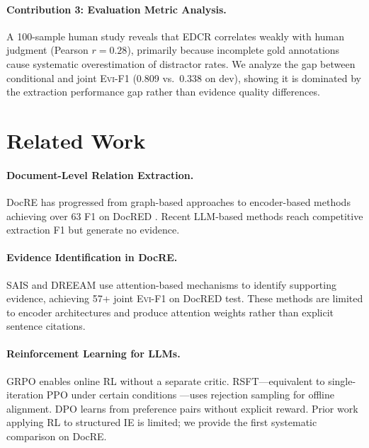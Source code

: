\documentclass[11pt,a4paper]{article}
\newcommand{\evi}{\textsc{Evi-F1}}
\newcommand{\edcr}{\textsc{EDCR}}
\begin{document}
\paragraph{Contribution 3: Evaluation Metric Analysis.}
A 100-sample human study reveals that \edcr{} correlates weakly with human judgment (Pearson $r{=}0.28$), primarily because incomplete gold annotations cause systematic overestimation of distractor rates. We analyze the gap between conditional and joint \evi{} (0.809 vs.\ 0.338 on dev), showing it is dominated by the extraction performance gap rather than evidence quality differences.

\section{Related Work}

\paragraph{Document-Level Relation Extraction.}
DocRE has progressed from graph-based approaches \cite{nan2020reasoning,zeng2020double} to encoder-based methods achieving over 63 F1 on DocRED \cite{yao2019docred}. Recent LLM-based methods \cite{xu2024lmrc,wadhwa2023revisiting} reach competitive extraction F1 but generate no evidence.

\paragraph{Evidence Identification in DocRE.}
SAIS \cite{xie2022eider} and DREEAM \cite{ma2023dreeam} use attention-based mechanisms to identify supporting evidence, achieving 57+ joint \evi{} on DocRED test. These methods are limited to encoder architectures and produce attention weights rather than explicit sentence citations.

\paragraph{Reinforcement Learning for LLMs.}
GRPO \cite{shao2024deepseekmath} enables online RL without a separate critic. RSFT---equivalent to single-iteration PPO under certain conditions \cite{tajwar2024preference}---uses rejection sampling for offline alignment. DPO \cite{rafailov2024direct} learns from preference pairs without explicit reward. Prior work applying RL to structured IE is limited; we provide the first systematic comparison on DocRE.
\end{document}
